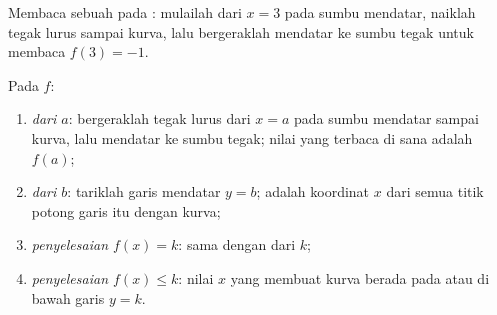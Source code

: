 \begin{omfigure}

{\small Membaca sebuah  pada : mulailah dari $x = 3$ pada sumbu
mendatar, naiklah tegak lurus sampai kurva, lalu bergeraklah mendatar ke
sumbu tegak untuk membaca $f(3) = -1$.}
\end{omfigure}

\begin{method}\label{met:g10:functions:reading}
Pada  $f$:
\begin{enumerate}
  \item \emph{ dari $a$}: bergeraklah tegak lurus dari $x = a$ pada sumbu
        mendatar sampai kurva, lalu mendatar ke sumbu tegak; nilai yang
        terbaca di sana adalah $f(a)$;
  \item \emph{ dari $b$}: tariklah garis mendatar $y = b$; 
        adalah koordinat $x$ dari semua titik potong garis itu
        dengan kurva;
  \item \emph{penyelesaian $f(x) = k$}: sama dengan  dari $k$;
  \item \emph{penyelesaian $f(x) \leq k$}: nilai $x$ yang membuat kurva
        berada pada atau di bawah garis $y = k$.
\end{enumerate}
\end{method}

